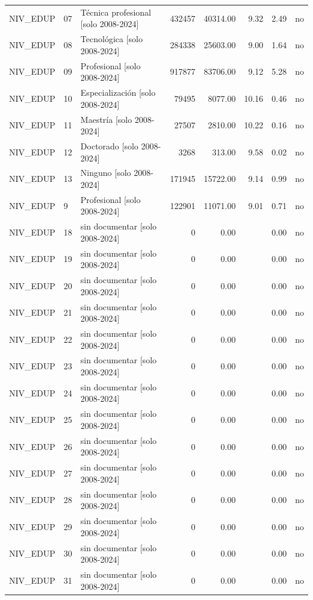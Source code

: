 \begin{tabular}{lllrrrrr}
NIV\_EDUP & 07 & Técnica profesional  [solo 2008-2024] & 432457 & 40314.00 & 9.32 & 2.49 & no \\
NIV\_EDUP & 08 & Tecnológica  [solo 2008-2024] & 284338 & 25603.00 & 9.00 & 1.64 & no \\
NIV\_EDUP & 09 & Profesional  [solo 2008-2024] & 917877 & 83706.00 & 9.12 & 5.28 & no \\
NIV\_EDUP & 10 & Especialización  [solo 2008-2024] & 79495 & 8077.00 & 10.16 & 0.46 & no \\
NIV\_EDUP & 11 & Maestría  [solo 2008-2024] & 27507 & 2810.00 & 10.22 & 0.16 & no \\
NIV\_EDUP & 12 & Doctorado  [solo 2008-2024] & 3268 & 313.00 & 9.58 & 0.02 & no \\
NIV\_EDUP & 13 & Ninguno  [solo 2008-2024] & 171945 & 15722.00 & 9.14 & 0.99 & no \\
NIV\_EDUP & 9 & Profesional  [solo 2008-2024] & 122901 & 11071.00 & 9.01 & 0.71 & no \\
NIV\_EDUP & 18 & sin documentar  [solo 2008-2024] & 0 & 0.00 &  & 0.00 & no \\
NIV\_EDUP & 19 & sin documentar  [solo 2008-2024] & 0 & 0.00 &  & 0.00 & no \\
NIV\_EDUP & 20 & sin documentar  [solo 2008-2024] & 0 & 0.00 &  & 0.00 & no \\
NIV\_EDUP & 21 & sin documentar  [solo 2008-2024] & 0 & 0.00 &  & 0.00 & no \\
NIV\_EDUP & 22 & sin documentar  [solo 2008-2024] & 0 & 0.00 &  & 0.00 & no \\
NIV\_EDUP & 23 & sin documentar  [solo 2008-2024] & 0 & 0.00 &  & 0.00 & no \\
NIV\_EDUP & 24 & sin documentar  [solo 2008-2024] & 0 & 0.00 &  & 0.00 & no \\
NIV\_EDUP & 25 & sin documentar  [solo 2008-2024] & 0 & 0.00 &  & 0.00 & no \\
NIV\_EDUP & 26 & sin documentar  [solo 2008-2024] & 0 & 0.00 &  & 0.00 & no \\
NIV\_EDUP & 27 & sin documentar  [solo 2008-2024] & 0 & 0.00 &  & 0.00 & no \\
NIV\_EDUP & 28 & sin documentar  [solo 2008-2024] & 0 & 0.00 &  & 0.00 & no \\
NIV\_EDUP & 29 & sin documentar  [solo 2008-2024] & 0 & 0.00 &  & 0.00 & no \\
NIV\_EDUP & 30 & sin documentar  [solo 2008-2024] & 0 & 0.00 &  & 0.00 & no \\
NIV\_EDUP & 31 & sin documentar  [solo 2008-2024] & 0 & 0.00 &  & 0.00 & no \\

\end{tabular}
